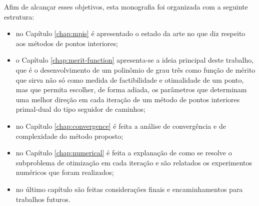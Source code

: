 Afim de alcançar  esses objetivos, esta monografia foi organizada com a seguinte estrutura: 

\begin{itemize}
	\item no Capítulo \ref{chap:mpis} é apresentado o estado da arte no
que diz respeito aos métodos de pontos interiores; 
\item o Capítulo \ref{chap:merit-function} apresenta-se a ideia principal deste trabalho, que é o
desenvolvimento de um polinômio de grau três como função de mérito  que sirva não só como medida
de factibilidade e otimalidade de um ponto, mas que permita escolher, de forma
adiada, os parâmetros que determinam uma melhor direção em cada iteração
de um método de pontos interiores primal-dual do tipo seguidor de caminhos; 
\item no Capítulo \ref{chap:convergence} é feita a análise de convergência e de complexidade do método proposto; 
\item no Capítulo \ref{chap:numerical} é feita a explanação de como se resolve o subproblema de otimização em cada iteração e são relatados os experimentos numéricos que foram realizados;
\item  no último capítulo são feitas considerações finais e encaminhamentos para trabalhos futuros.


\end{itemize}

